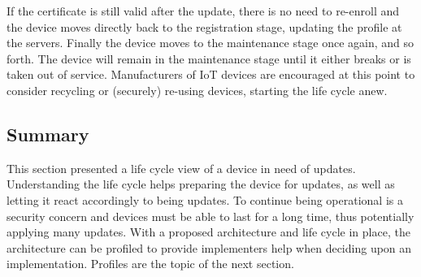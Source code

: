 \documentclass[0-thesis.tex]{subfiles}
\begin{document}
If the certificate is still valid after the update, there is no need to re-enroll and the
device moves directly back to the registration stage, updating the profile at the servers.
Finally the device moves to the maintenance stage once again, and so forth. The device
will remain in the maintenance stage until it either breaks or is taken out of service.
Manufacturers of IoT devices are encouraged at this point to consider recycling or
(securely) re-using devices, starting the life cycle anew.

\subsection{Summary}
\label{ssec:life-cycle-summary}
This section presented a life cycle view of a device in need of updates. Understanding the
life cycle helps preparing the device for updates, as well as letting it react accordingly
to being updates. To continue being operational is a security concern and devices must be
able to last for a long time, thus potentially applying many updates. With a proposed
architecture and life cycle in place, the architecture can be profiled to provide
implementers help when deciding upon an implementation. Profiles are the topic of the next
section.
\end{document}
